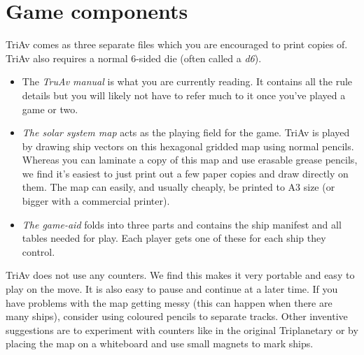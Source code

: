 \documentclass[a4paper,12pt,notitlepage,twocolumn]{article}
\begin{document}
\section{Game components}
TriAv comes as three separate files which you are encouraged to
print copies of. TriAv also requires a normal 6-sided die (often
called a \emph{d6}). 
\label{sec:game_components}
\begin{itemize}
\item The \emph{TruAv manual} is what you are currently reading. It
  contains all the rule details but you will likely not have to refer
  much to it once you've played a game or two. 
\item \emph{The solar system map} acts as the playing
  field for the game. TriAv is played by drawing ship 
  vectors on this hexagonal gridded map using normal pencils. Whereas
  you can laminate a copy of this map and use erasable grease pencils,
  we find it's easiest to just print out a few paper copies and draw
  directly on them. The map can easily, and usually cheaply, be printed
  to A3 size (or bigger with a commercial printer).
\item  \emph{The game-aid} folds into three parts and contains the ship
  manifest and all tables needed for play. Each player gets one of
  these for each ship they control.  
\end{itemize} 
TriAv does not use any counters. We find this makes it very portable and
easy to play on the move. It is also easy to pause and continue at a
later time. If you have problems with the map getting messy (this can
happen when there are many ships), consider using coloured pencils to
separate tracks. Other 
inventive suggestions are to experiment with counters like in the
original Triplanetary or by placing the map on a whiteboard and use
small magnets to mark ships.   
\end{document}
